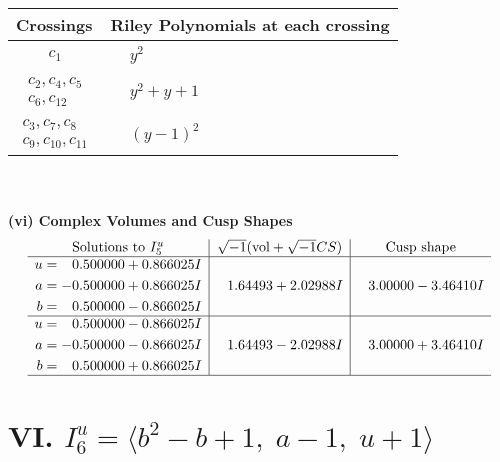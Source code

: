 \documentclass[1p]{elsarticle_modified}
\theoremstyle{definition}
\newcommand{\I}{\sqrt{-1}}
\begin{document}
\begin{tabular}{m{50pt}|m{274pt}}
Crossings & \hspace{64pt}Riley Polynomials at each crossing \\
\hline $$\begin{aligned}c_{1}\end{aligned}$$&$\begin{aligned}
&y^2
\end{aligned}$\\
\hline $$\begin{aligned}c_{2},c_{4},c_{5}\\c_{6},c_{12}\end{aligned}$$&$\begin{aligned}
&y^2+y+1
\end{aligned}$\\
\hline $$\begin{aligned}c_{3},c_{7},c_{8}\\c_{9},c_{10},c_{11}\end{aligned}$$&$\begin{aligned}
&(y-1)^2
\end{aligned}$\\
\hline
\end{tabular}\\~\\
\newpage\flushleft \textbf{(vi) Complex Volumes and Cusp Shapes}
$$\begin{array}{c|c|c}  
\text{Solutions to }I^u_{5}& \I (\text{vol} + \sqrt{-1}CS) & \text{Cusp shape}\\
 \hline 
\begin{aligned}
u &= \phantom{-}0.500000 + 0.866025 I \\
a &= -0.500000 + 0.866025 I \\
b &= \phantom{-}0.500000 - 0.866025 I\end{aligned}
 & \phantom{-}1.64493 + 2.02988 I & \phantom{-}3.00000 - 3.46410 I \\ \hline\begin{aligned}
u &= \phantom{-}0.500000 - 0.866025 I \\
a &= -0.500000 - 0.866025 I \\
b &= \phantom{-}0.500000 + 0.866025 I\end{aligned}
 & \phantom{-}1.64493 - 2.02988 I & \phantom{-}3.00000 + 3.46410 I\\
 \hline 
 \end{array}$$\newpage\newpage\renewcommand{\arraystretch}{1}
\centering \section*{VI. $I^u_{6}= \langle b^2- b+1,\;a-1,\;u+1 \rangle$}
\end{document}
